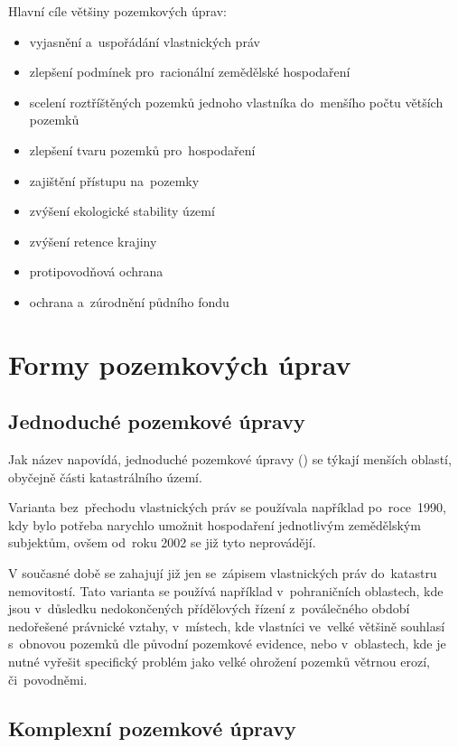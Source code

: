 Hlavní cíle většiny pozemkových úprav:
\vspace{-\topsep}
	\begin{itemize}[leftmargin=1.5cm, noitemsep]
		\item vyjasnění a~uspořádání vlastnických práv
		\item zlepšení podmínek pro~racionální zemědělské hospodaření
		\item scelení roztříštěných pozemků jednoho vlastníka do~menšího počtu větších pozemků
		\item zlepšení tvaru pozemků pro~hospodaření
		\item zajištění přístupu na~pozemky
		\item zvýšení ekologické stability území
		\item zvýšení retence krajiny
		\item protipovodňová ochrana
		\item ochrana a~zúrodnění půdního fondu
	\end{itemize}

\section{Formy pozemkových úprav}
\label{formy_pu}

\subsection{Jednoduché pozemkové úpravy}
\label{jednoduche_pu}

Jak název napovídá, jednoduché pozemkové úpravy () se týkají
menších oblastí, obyčejně části katastrálního území.

Varianta  bez~přechodu vlastnických práv se používala
například po~ro\-ce~1990, kdy bylo potřeba narychlo umožnit
hospodaření jednotlivým zemědělským subjektům, ovšem od~roku 2002 se
již tyto  neprovádějí.

V současné době se zahajují již jen  se~zápisem vlastnických
práv do~kata\-stru nemovitostí. Tato varianta  se používá
například v~pohraničních oblastech, kde jsou v~důsledku nedokončených
přídělových řízení z~poválečného období nedořešené právnické vztahy,
v~místech, kde vlastníci ve~velké většině souhlasí s~obnovou pozemků
dle původní pozemkové evidence, nebo v~oblastech, kde je nutné vyřešit
specifický problém jako velké ohrožení pozemků větrnou erozí,
či~povodněmi.

\subsection{Komplexní pozemkové úpravy}
\label{komplexní_pu}

